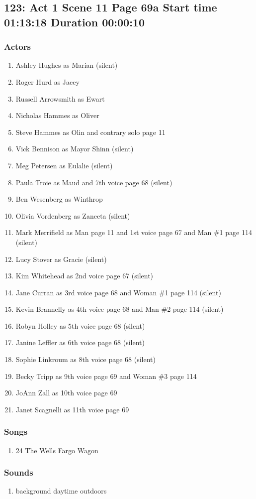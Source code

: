 \subsection{123: Act 1 Scene 11 Page 69a Start time 01:13:18 Duration 00:00:10}

\subsubsection{Actors}
\begin{enumerate}
\item Ashley Hughes as Marian (silent)
\item Roger Hurd as Jacey
\item Russell Arrowsmith as Ewart
\item Nicholas Hammes as Oliver
\item Steve Hammes as Olin and contrary solo page 11
\item Vick Bennison as Mayor Shinn (silent)
\item Meg Petersen as Eulalie (silent)
\item Paula Troie as Maud and 7th voice page 68 (silent)
\item Ben Wesenberg as Winthrop
\item Olivia Vordenberg as Zaneeta (silent)
\item Mark Merrifield as Man page 11 and 1st voice page 67 and Man \#1 page 114 (silent)
\item Lucy Stover as Gracie (silent)
\item Kim Whitehead as 2nd voice page 67 (silent)
\item Jane Curran as 3rd voice page 68 and Woman \#1 page 114 (silent)
\item Kevin Brannelly as 4th voice page 68 and Man \#2 page 114 (silent)
\item Robyn Holley as 5th voice page 68 (silent)
\item Janine Leffler as 6th voice page 68 (silent)
\item Sophie Linkroum as 8th voice page 68 (silent)
\item Becky Tripp as 9th voice page 69 and Woman \#3 page 114
\item JoAnn Zall as 10th voice page 69
\item Janet Scagnelli as 11th voice page 69
\end{enumerate}

\subsubsection{Songs}
\begin{enumerate}
\item 24 The Wells Fargo Wagon
\end{enumerate}\subsubsection{Sounds}
\begin{enumerate}
\item background daytime outdoors
\end{enumerate}
